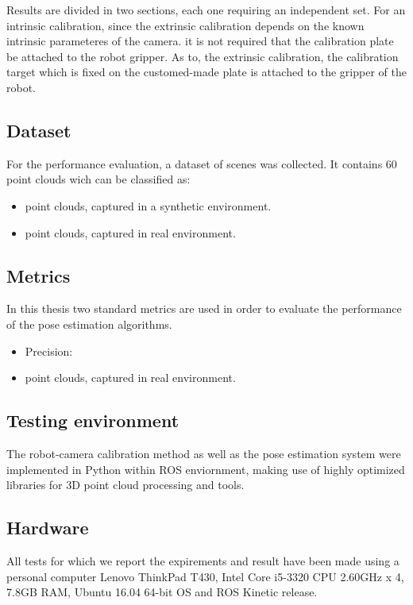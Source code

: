  Results are divided in two sections, each one requiring an independent set. For an intrinsic calibration, since the extrinsic calibration depends on the known intrinsic parameteres of the camera.  it is not required that the calibration plate be attached to the robot gripper. As to, the extrinsic calibration, the calibration target which is fixed on the customed-made plate is attached to the gripper of the robot.



\subsection{Dataset}

For the performance evaluation, a dataset of scenes was collected. It contains 60 point clouds wich can be classified as:
\begin{itemize}
\item point clouds, captured in a synthetic environment.
\item point clouds, captured in real environment. 
\end{itemize}

\subsection{Metrics}
In this thesis two standard metrics are used in order to evaluate the performance of the pose estimation algorithms.
\begin{itemize}
\item Precision:
\item point clouds, captured in real environment. 
\end{itemize}

\subsection{Testing environment}
The robot-camera calibration method as well as the pose estimation system were implemented in Python within ROS enviornment, making use of highly optimized libraries for 3D point cloud processing and tools. 

\subsection{Hardware}
All tests for which we report the expirements and result have been made using a personal computer Lenovo ThinkPad T430, Intel Core i5-3320 CPU 2.60GHz x 4, 7.8GB RAM, Ubuntu 16.04 64-bit OS
and ROS Kinetic release.

\fi